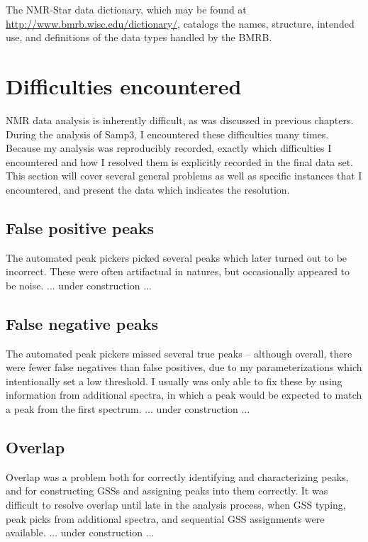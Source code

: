 The NMR-Star data dictionary, which may be found at 
\url{http://www.bmrb.wisc.edu/dictionary/}, catalogs the names, structure,
intended use, and definitions of the data types handled by the BMRB.


\section{Difficulties encountered}

NMR data analysis is inherently difficult, as was discussed in previous 
chapters.  During the analysis of Samp3, I encountered these difficulties 
many times.  Because my analysis was reproducibly recorded, exactly which
difficulties I encountered and how I resolved them is explicitly recorded
in the final data set.  This section will cover several general problems
as well as specific instances that I encountered, and present the data which
indicates the resolution.

\subsection{False positive peaks}
The automated peak pickers picked several peaks which later turned out to
be incorrect.  These were often artifactual in natures, but occasionally 
appeared to be noise.
... under construction ...

\subsection{False negative peaks}
The automated peak pickers missed several true peaks -- although overall,
there were fewer false negatives than false positives, due to my parameterizations
which intentionally set a low threshold.  I usually was only able to fix
these by using information from additional spectra, in which a peak would
be expected to match a peak from the first spectrum.
... under construction ...

\subsection{Overlap}
Overlap was a problem both for correctly identifying and characterizing peaks,
and for constructing GSSs and assigning peaks into them correctly.
It was difficult to resolve overlap until late in the analysis process, when
GSS typing, peak picks from additional spectra, and sequential GSS assignments
were available.
... under construction ...

